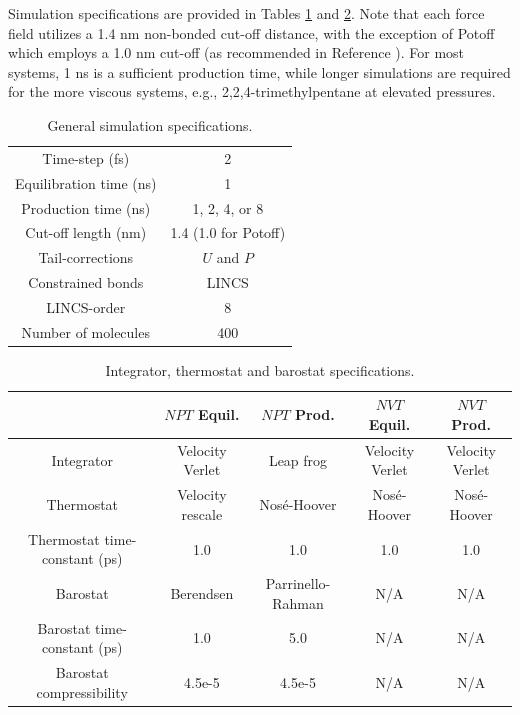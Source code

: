 \documentclass[preprint,review,12pt]{elsarticle}
\begin{document}
	
	Simulation specifications are provided in Tables \ref{tab:sim_specs} and \ref{tab:thermostats_barostats}. Note that each force field utilizes a 1.4 nm non-bonded cut-off distance, with the exception of Potoff which employs a 1.0 nm cut-off (as recommended in Reference ). For most systems, 1 ns is a sufficient production time, while longer simulations are required for the more viscous systems, e.g., 2,2,4-trimethylpentane at elevated pressures. 
	 
	\begin{table}[htb!]
		\caption{General simulation specifications.} \label{tab:sim_specs}
		\begin{center}
			\begin{tabular}{|c|c|}
				\hline
				Time-step (fs) & 2 \\
				Equilibration time (ns) & 1 \\
				Production time (ns) & 1, 2, 4, or 8 \\
				Cut-off length (nm) & 1.4 (1.0 for Potoff) \\
				Tail-corrections \cite{GROMACS_note} & $U$ and $P$ \\
				Constrained bonds & LINCS \\
				LINCS-order & 8 \\			     
				Number of molecules & 400 \\
				\hline        
			\end{tabular}
		\end{center}
	\end{table}
	
	\begin{table}[h!]
		\caption{Integrator, thermostat and barostat specifications.} \label{tab:thermostats_barostats}
		\begin{center}
			\begin{tabular}{|c|c|c|c|c|}
				\hline
				& $NPT$ Equil. & $NPT$ Prod. & $NVT$ Equil. & $NVT$ Prod. \\ \hline
				Integrator & Velocity Verlet & Leap frog & Velocity Verlet & Velocity Verlet \\ \hline 
				Thermostat & Velocity rescale & Nos{\'e}-Hoover & Nos{\'e}-Hoover & Nos{\'e}-Hoover \\ \hline 
				Thermostat time-constant (ps) & 1.0 & 1.0 & 1.0 & 1.0 \\ \hline
				Barostat & Berendsen & Parrinello-Rahman & N/A & N/A \\ \hline
				Barostat time-constant (ps) & 1.0 & 5.0 & N/A & N/A \\ \hline
				Barostat compressibility & 4.5e-5 & 4.5e-5 & N/A & N/A \\
				\hline
			\end{tabular}
		\end{center} 
	\end{table}
	
\end{document}
